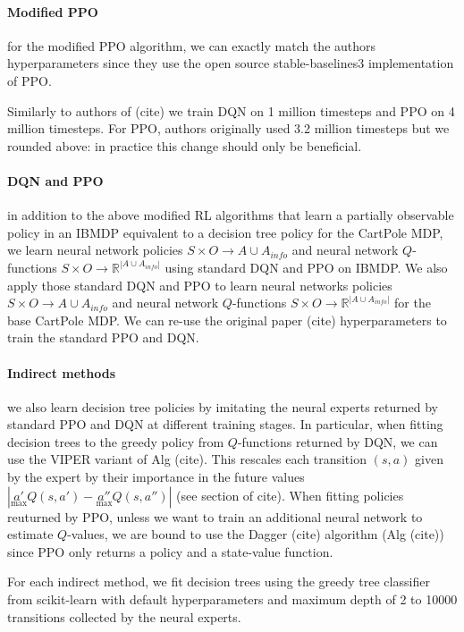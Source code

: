 \paragraph{Modified PPO} for the modified PPO algorithm, we can exactly match the authors hyperparameters since they use the open source stable-baselines3 implementation of PPO.

Similarly to authors of (cite) we train DQN on 1 million timesteps and PPO on 4 million timesteps. For PPO, authors originally used 3.2 million timesteps but we rounded above: in practice this change should only be beneficial.

\paragraph{DQN and PPO} in addition to the above modified RL algorithms that learn a partially observable policy in an IBMDP equivalent to a decision tree policy for the CartPole MDP, we learn neural network policies $S\times O \rightarrow A\cup A_{info}$ and neural network $Q$-functions $S\times O \rightarrow \mathbb{R}^{|A\cup A_{info}|}$ using standard DQN and PPO on IBMDP.
We also apply those standard DQN and PPO to learn neural networks policies $S\times O \rightarrow A\cup A_{info}$ and neural network $Q$-functions $S\times O \rightarrow \mathbb{R}^{|A\cup A_{info}|}$ for the base CartPole MDP.
We can re-use the original paper (cite) hyperparameters to train the standard PPO and DQN. 

\paragraph{Indirect methods} we also learn decision tree policies by imitating the neural experts returned by standard PPO and DQN at different training stages.
In particular, when fitting decision trees to the greedy policy from $Q$-functions returned by DQN, we can use the VIPER variant of Alg (cite). This rescales each transition $(s, a)$ given by the expert by their importance in the future values $|\underset{\max}{a'}Q(s, a') - \underset{\max}{a''}Q(s, a'')|$ (see section of cite).
When fitting policies reuturned by PPO, unless we want to train an additional neural network to estimate $Q$-values, we are bound to use the Dagger (cite) algorithm (Alg (cite)) since PPO only returns a policy and a state-value function.

For each indirect method, we fit decision trees using the greedy tree classifier from scikit-learn with default hyperparameters and maximum depth of 2 to 10000 transitions collected by the neural experts.

